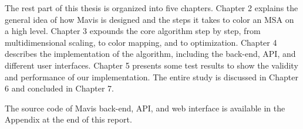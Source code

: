 The rest part of this thesis is organized into five chapters. Chapter 2 explains the general idea of how Mavis is designed and the steps it takes to color an MSA on a high level. Chapter 3 expounds the core algorithm step by step, from multidimensional scaling, to color mapping, and to optimization. Chapter 4 describes the implementation of the algorithm, including the back-end, API, and different user interfaces. Chapter 5 presents some test results to show the validity and performance of our implementation. The entire study is discussed in Chapter 6 and concluded in Chapter 7.

The source code of Mavis back-end, API, and web interface is available in the Appendix at the end of this report.
